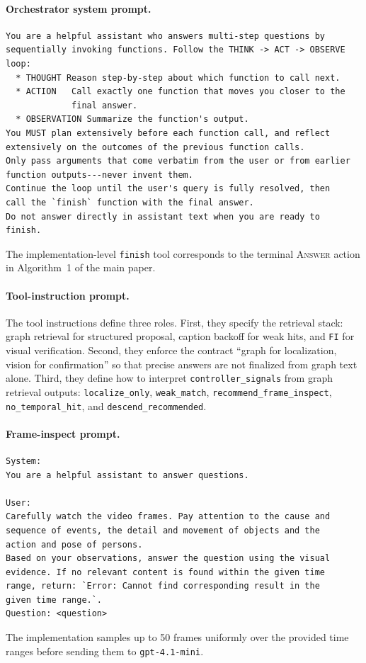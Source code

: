 \documentclass[sigconf, screen, review, anonymous]{acmart}
\newcommand{\code}[1]{\texttt{\nolinkurl{#1}}}
\begin{document}
\paragraph{Orchestrator system prompt.}
\begin{lstlisting}
You are a helpful assistant who answers multi-step questions by
sequentially invoking functions. Follow the THINK -> ACT -> OBSERVE
loop:
  * THOUGHT Reason step-by-step about which function to call next.
  * ACTION   Call exactly one function that moves you closer to the
             final answer.
  * OBSERVATION Summarize the function's output.
You MUST plan extensively before each function call, and reflect
extensively on the outcomes of the previous function calls.
Only pass arguments that come verbatim from the user or from earlier
function outputs---never invent them.
Continue the loop until the user's query is fully resolved, then
call the `finish` function with the final answer.
Do not answer directly in assistant text when you are ready to
finish.
\end{lstlisting}
The implementation-level \code{finish} tool corresponds to the terminal \textsc{Answer} action in Algorithm~1 of the main paper.

\paragraph{Tool-instruction prompt.}
The tool instructions define three roles. First, they specify the retrieval
stack: graph retrieval for structured proposal, caption backoff for weak hits,
and \code{FI} for visual verification. Second, they enforce the contract
``graph for localization, vision for confirmation'' so that precise answers are
not finalized from graph text alone. Third, they define how to interpret
\code{controller_signals} from graph retrieval outputs:
\code{localize_only}, \code{weak_match}, \code{recommend_frame_inspect},
\code{no_temporal_hit}, and \code{descend_recommended}.

\paragraph{Frame-inspect prompt.}
\begin{lstlisting}
System:
You are a helpful assistant to answer questions.

User:
Carefully watch the video frames. Pay attention to the cause and
sequence of events, the detail and movement of objects and the
action and pose of persons.
Based on your observations, answer the question using the visual
evidence. If no relevant content is found within the given time
range, return: `Error: Cannot find corresponding result in the
given time range.`.
Question: <question>
\end{lstlisting}
The implementation samples up to 50 frames uniformly over the provided time ranges before sending them to \code{gpt-4.1-mini}.
\end{document}
